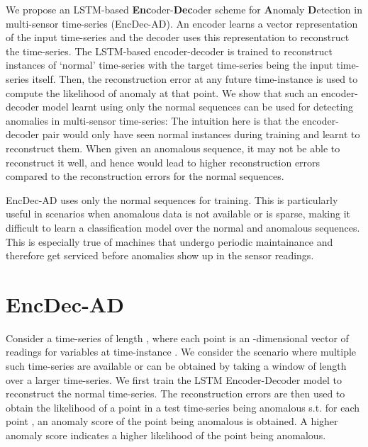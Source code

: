 \documentclass{article}
\begin{document}
We propose an LSTM-based \textbf{Enc}oder-\textbf{Dec}oder scheme for \textbf{A}nomaly \textbf{D}etection in multi-sensor time-series (EncDec-AD). An encoder learns a vector representation of the input time-series and the decoder uses this representation to reconstruct the time-series. The LSTM-based encoder-decoder is trained to reconstruct instances of `normal' time-series with the target time-series being the input time-series itself. Then, the reconstruction error at any future time-instance is used to compute the likelihood of anomaly at that point. We show that such an encoder-decoder model learnt using only the normal sequences can be used for detecting anomalies in multi-sensor time-series: 
The intuition here is that the encoder-decoder pair would only have seen normal instances during training and learnt to reconstruct them. When given an anomalous sequence, it may not be able to reconstruct it well, and hence would lead to higher reconstruction errors compared to the reconstruction errors for the normal sequences.

EncDec-AD uses only the normal sequences for training. This is particularly useful in scenarios when anomalous data is not available or is sparse,  making it difficult to learn a classification model over the normal and anomalous sequences. This is especially true of machines that undergo periodic maintainance and therefore get serviced before anomalies show up in the sensor readings. 
\section{EncDec-AD}
Consider a time-series  of length , where each point  is an -dimensional vector of readings for  variables at time-instance . We consider the scenario where multiple such time-series are available or can be obtained by taking a window of length  over a larger time-series. We first train the LSTM Encoder-Decoder model to reconstruct the normal time-series. The reconstruction errors are then used to obtain the likelihood of a point in a test time-series being anomalous s.t. for each point , an anomaly score  of the point being anomalous is obtained. A higher anomaly score indicates a higher likelihood of the point being anomalous.
\end{document}
